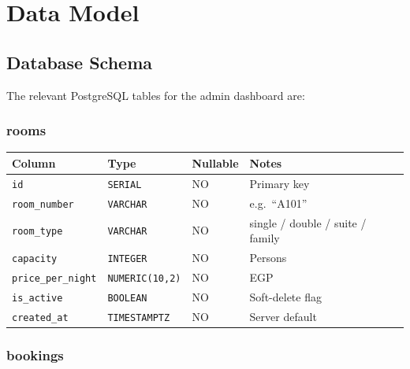 \documentclass[12pt,a4paper]{report}
\begin{document}
\chapter{Data Model}

\section{Database Schema}

The relevant PostgreSQL tables for the admin dashboard are:

\subsection{rooms}

\begin{center}
\begin{tabular}{llll}
  \toprule
  \textbf{Column} & \textbf{Type} & \textbf{Nullable} & \textbf{Notes} \\
  \midrule
  \texttt{id}              & \texttt{SERIAL}        & NO  & Primary key \\
  \texttt{room\_number}    & \texttt{VARCHAR}        & NO  & e.g.\ ``A101'' \\
  \texttt{room\_type}      & \texttt{VARCHAR}        & NO  & single / double / suite / family \\
  \texttt{capacity}        & \texttt{INTEGER}        & NO  & Persons \\
  \texttt{price\_per\_night} & \texttt{NUMERIC(10,2)} & NO  & EGP \\
  \texttt{is\_active}      & \texttt{BOOLEAN}        & NO  & Soft-delete flag \\
  \texttt{created\_at}     & \texttt{TIMESTAMPTZ}    & NO  & Server default \\
  \bottomrule
\end{tabular}
\end{center}

\subsection{bookings}
\end{document}
